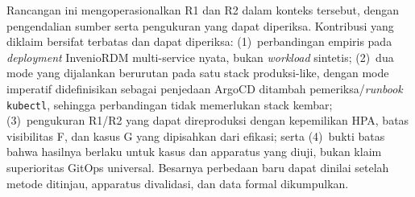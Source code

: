 Rancangan ini mengoperasionalkan R1 dan R2 dalam konteks tersebut, dengan pengendalian sumber serta pengukuran yang dapat diperiksa. Kontribusi yang diklaim bersifat terbatas dan dapat diperiksa: (1)~perbandingan empiris pada \textit{deployment} InvenioRDM multi-service nyata, bukan \textit{workload} sintetis; (2)~dua mode yang dijalankan berurutan pada satu stack produksi-like, dengan mode imperatif didefinisikan sebagai penjedaan ArgoCD ditambah pemeriksa/\textit{runbook} \texttt{kubectl}, sehingga perbandingan tidak memerlukan stack kembar; (3)~pengukuran R1/R2 yang dapat direproduksi dengan kepemilikan HPA, batas visibilitas F, dan kasus G yang dipisahkan dari efikasi; serta (4)~bukti batas bahwa hasilnya berlaku untuk kasus dan apparatus yang diuji, bukan klaim superioritas GitOps universal. Besarnya perbedaan baru dapat dinilai setelah metode ditinjau, apparatus divalidasi, dan data formal dikumpulkan.
